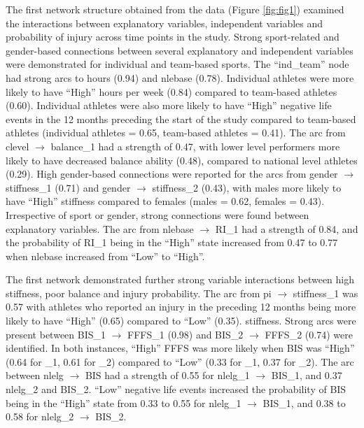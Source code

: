 \documentclass[
  english,
  man]{apa6}
\begin{document}
The first network structure obtained from the data (Figure \ref{fig:fig1}) examined the interactions between explanatory variables, independent variables and probability of injury across time points in the study.
Strong sport-related and gender-based connections between several explanatory and independent variables were demonstrated for individual and team-based sports.
The ``ind\_team'' node had strong arcs to hours (0.94) and nlebase (0.78).
Individual athletes were more likely to have ``High'' hours per week (0.84) compared to team-based athletes (0.60).
Individual athletes were also more likely to have ``High'' negative life events in the 12 months preceding the start of the study compared to team-based athletes (individual athletes = 0.65, team-based athletes = 0.41).
The arc from clevel \(\rightarrow\) balance\_1 had a strength of 0.47, with lower level performers more likely to have decreased balance ability (0.48), compared to national level athletes (0.29).
High gender-based connections were reported for the arcs from gender \(\rightarrow\) stiffness\_1 (0.71) and gender \(\rightarrow\) stiffness\_2 (0.43), with males more likely to have ``High'' stiffness compared to females (males = 0.62, females = 0.43).
Irrespective of sport or gender, strong connections were found between explanatory variables. The arc from nlebase \(\rightarrow\) RI\_1 had a strength of 0.84, and the probability of RI\_1 being in the ``High'' state increased from 0.47 to 0.77 when nlebase increased from ``Low'' to ``High''.

The first network demonstrated further strong variable interactions between high stiffness, poor balance and injury probability.
The arc from pi \(\rightarrow\) stiffness\_1 was 0.57 with athletes who reported an injury in the preceding 12 months being more likely to have ``High'' (0.65) compared to ``Low'' (0.35). stiffness.
Strong arcs were present between BIS\_1 \(\rightarrow\) FFFS\_1 (0.98) and BIS\_2 \(\rightarrow\) FFFS\_2 (0.74) were identified.
In both instances, ``High'' FFFS was more likely when BIS was ``High'' (0.64 for \_1, 0.61 for \_2) compared to ``Low'' (0.33 for \_1, 0.37 for \_2).
The arc between nlelg \(\rightarrow\) BIS had a strength of 0.55 for nlelg\_1 \(\rightarrow\) BIS\_1, and 0.37 nlelg\_2 and BIS\_2.
``Low'' negative life events increased the probability of BIS being in the ``High'' state from 0.33 to 0.55 for nlelg\_1 \(\rightarrow\) BIS\_1, and 0.38 to 0.58 for nlelg\_2 \(\rightarrow\) BIS\_2.
\end{document}
